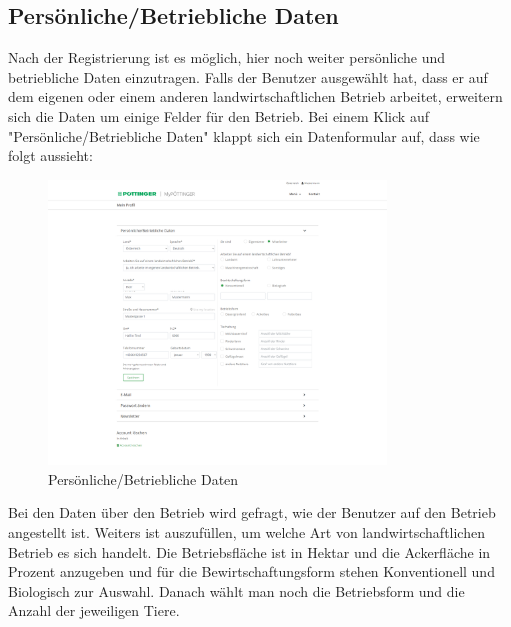\subsection{Persönliche/Betriebliche Daten}
Nach der Registrierung ist es möglich, hier noch weiter persönliche und betriebliche Daten einzutragen. Falls der Benutzer ausgewählt hat, dass er auf dem eigenen oder einem anderen landwirtschaftlichen Betrieb arbeitet, erweitern sich die Daten um einige Felder für den Betrieb. Bei einem Klick auf "Persönliche/Betriebliche Daten" klappt sich ein Datenformular auf, dass wie folgt aussieht:
\begin{figure}[H]
	\centerline{
		\includegraphics[width=0.8\textwidth]{./grafiken/erm_profil_daten.png}
	}
	\vskip0pt
	\caption{Persönliche/Betriebliche Daten} \label{fig:profilData}
\end{figure}
Bei den Daten über den Betrieb wird gefragt, wie der Benutzer auf den Betrieb angestellt ist. Weiters ist auszufüllen, um welche Art von landwirtschaftlichen Betrieb es sich handelt. Die Betriebsfläche ist in Hektar und die Ackerfläche in Prozent anzugeben und für die Bewirtschaftungsform stehen Konventionell und Biologisch zur Auswahl. Danach wählt man noch die Betriebsform und die Anzahl der jeweiligen Tiere.
